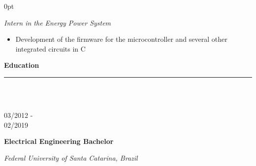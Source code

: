 \documentclass[a4paper]{article}
\begin{document}
\begin{adjustwidth}{\parindent}{0pt}
\begin{minipage}[t]{0.65\textwidth}
\begin{minipage}[t]{0.8\textwidth}
{  \large{\textit{Intern in the Energy Power System}}
}
\begin{itemize}
  \item \normalsize{Development of the firmware for the microcontroller and several other integrated circuits in C}
\end{itemize}
  
\end{minipage}

\Large{\textbf{Education}} \normalsize \\ \rule{\textwidth}{0.5pt} \\ \\
\begin{minipage}[t]{0.2\textwidth}
\large{03/2012 - \\ 02/2019}
\end{minipage}
\begin{minipage}[t]{0.8\textwidth}
{
  \setlength{\parskip}{5.5pt}
  \Large{\textbf{Electrical Engineering Bachelor}}
  
  \large{\textit{Federal University of Santa Catarina, Brazil}} \\
}
\end{minipage} \\ \\


\end{minipage}
\end{adjustwidth}
\end{document}
